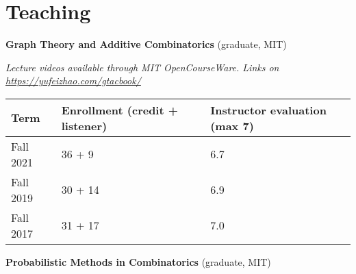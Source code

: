 \documentclass[11pt]{amsart}
\newcommand{\rightloc}[1]{\hfill {\raggedright #1}}
\begin{document}
%
%
%




\section*{Teaching}

\textbf{Graph Theory and Additive Combinatorics} (graduate, MIT) 

\emph{Lecture videos available through MIT OpenCourseWare. Links on \url{https://yufeizhao.com/gtacbook/}}

\qquad 
\begin{tabular}[l]{p{2cm}p{3cm}p{3.5cm}}
\toprule
Term & Enrollment \newline (credit + listener) & Instructor evaluation \newline  (max 7) \\
\midrule
Fall 2021 & 36 +  9 & 6.7 \\
Fall 2019 & 30 + 14 & 6.9 \\
Fall 2017 & 31 + 17 & 7.0 \\
\bottomrule
\end{tabular}

\medskip


\textbf{Probabilistic Methods in Combinatorics} (graduate, MIT) 
\end{document}

